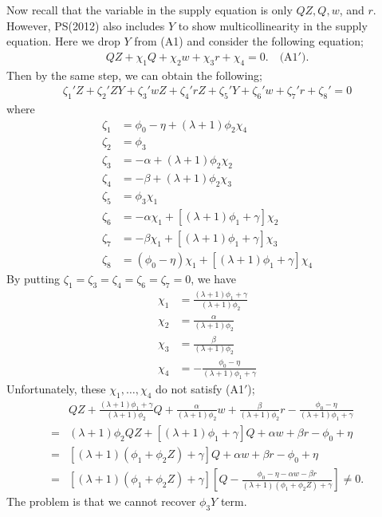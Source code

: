 \documentclass[11pt, a4paper]{article}
\begin{document}
Now recall that the variable in the supply equation is only $QZ, Q, w$, and $r$.
However, PS(2012) also includes $Y$ to show multicollinearity in the supply equation.
Here we drop $Y$ from (A1) and consider the following equation;
\begin{align*}
    QZ + \chi_1 Q + \chi_2 w + \chi_3 r + \chi_4 = 0.\quad \text{(A1$'$)}.
\end{align*}
Then by the same step, we can obtain the following;
\begin{align*}
    \zeta_1' Z + \zeta_2' ZY + \zeta_3' wZ + \zeta_4' rZ + \zeta_5' Y + \zeta_6' w + \zeta_7' r + \zeta_8' = 0 
\end{align*}
where
\begin{align*}
    \zeta_1 &= \phi_0 - \eta + (\lambda + 1)\phi_2\chi_4\\
    \zeta_2 &= \phi_3\\
    \zeta_3 &= - \alpha +(\lambda + 1)\phi_2\chi_2\\
    \zeta_4 &= -\beta + (\lambda + 1)\phi_2\chi_3\\
    \zeta_5 &=  \phi_3\chi_1\\
    \zeta_6 &= - \alpha\chi_1 +[(\lambda + 1)\phi_1 + \gamma]\chi_2\\
    \zeta_7 &= - \beta\chi_1 +[(\lambda + 1)\phi_1 + \gamma]\chi_3\\
    \zeta_8 &= (\phi_0 -\eta)\chi_1 + [(\lambda + 1)\phi_1 + \gamma]\chi_4
\end{align*}
By putting $\zeta_1 = \zeta_3 = \zeta_4 = \zeta_6 = \zeta_7 =0$, we have
\begin{align*}
        \chi_1 &= \frac{(\lambda + 1)\phi_1 + \gamma}{(\lambda + 1)\phi_2}\\
        \chi_2 &= \frac{\alpha}{(\lambda + 1)\phi_2}\\
        \chi_3 &= \frac{\beta}{(\lambda + 1)\phi_2}\\
        \chi_4 &= -\frac{\phi_0 - \eta}{(\lambda + 1)\phi_1 + \gamma}
\end{align*}
Unfortunately, these $\chi_1, \ldots, \chi_4$ do not satisfy (A1$'$); 
\begin{align*}
    &QZ + \frac{(\lambda + 1)\phi_1 + \gamma}{(\lambda + 1)\phi_2}Q +  \frac{\alpha}{(\lambda + 1)\phi_2} w +  \frac{\beta}{(\lambda + 1)\phi_2}r -\frac{\phi_0 - \eta}{(\lambda + 1)\phi_1 + \gamma} \\
    =& (\lambda + 1)\phi_2QZ + [(\lambda + 1)\phi_1 + \gamma]Q  + \alpha w + \beta r - \phi_0 + \eta\\
    =& [(\lambda + 1)(\phi_1 + \phi_2 Z) + \gamma]Q  + \alpha w + \beta r - \phi_0 + \eta\\
    =& [(\lambda + 1)(\phi_1 + \phi_2 Z) + \gamma]\left[ Q - \frac{\phi_0 - \eta- \alpha w - \beta r}{(\lambda + 1)(\phi_1 + \phi_2 Z) + \gamma}\right]\ne 0.
\end{align*}
The problem is that we cannot recover $\phi_3 Y$ term.
\end{document}
